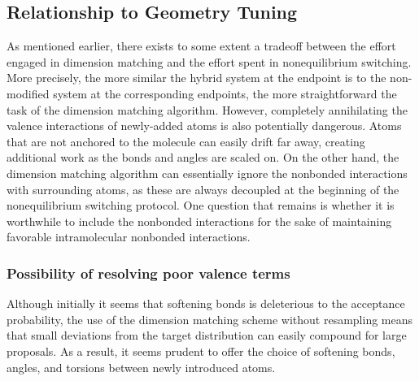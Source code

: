 \subsection{Relationship to Geometry Tuning}
%
As mentioned earlier, there exists to some extent a tradeoff between the effort engaged in dimension matching and the effort spent in nonequilibrium switching.
%
More precisely, the more similar the hybrid system at the endpoint is to the non-modified system at the corresponding endpoints, the more straightforward the task of the dimension matching algorithm.
%
However, completely annihilating the valence interactions of newly-added atoms is also potentially dangerous.
%
Atoms that are not anchored to the molecule can easily drift far away, creating additional work as the bonds and angles are scaled on.
%
On the other hand, the dimension matching algorithm can essentially ignore the nonbonded interactions with surrounding atoms, as these are always decoupled at the beginning of the nonequilibrium switching protocol.
%
One question that remains is whether it is worthwhile to include the nonbonded interactions for the sake of maintaining favorable intramolecular nonbonded interactions.
%
%
%
\subsubsection{Possibility of resolving poor valence terms}
%
Although initially it seems that softening bonds is deleterious to the acceptance probability, the use of the dimension matching scheme without resampling means that small deviations from the target distribution can easily compound for large proposals.
%
As a result, it seems prudent to offer the choice of softening bonds, angles, and torsions between newly introduced atoms.
%
\nowidow[5]